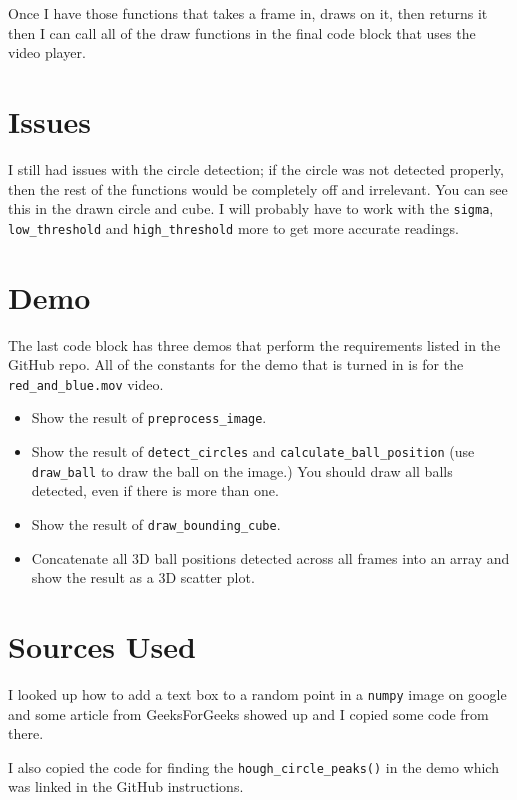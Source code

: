 \documentclass[11pt]{article}
\begin{document}
Once I have those functions that takes a frame in, draws on it, then returns it then I can call all of the draw functions in the final code block that uses the video player.

\section{Issues}

I still had issues with the circle detection; if the circle was not detected properly, then the rest of the functions would be completely off and irrelevant.
You can see this in the drawn circle and cube.
I will probably have to work with the \lstinline{sigma}, \lstinline{low_threshold} and \lstinline{high_threshold} more to get more accurate readings.

\section{Demo}

The last code block has three demos that perform the requirements listed in the GitHub repo.
All of the constants for the demo that is turned in is for the \lstinline{red_and_blue.mov} video.

\begin{itemize}
	\item Show the result of \lstinline{preprocess_image}.
	\item Show the result of \lstinline{detect_circles} and \lstinline{calculate_ball_position} (use \lstinline{draw_ball} to draw the ball on the image.) You should draw all balls detected, even if there is more than one.
	\item Show the result of \lstinline{draw_bounding_cube}.
	\item Concatenate all 3D ball positions detected across all frames into an array and show the result as a 3D scatter plot.

\end{itemize}

\section{Sources Used}

I looked up how to add a text box to a random point in a \lstinline{numpy} image on google and some article from GeeksForGeeks showed up and I copied some code from there.

I also copied the code for finding the \lstinline{hough_circle_peaks()} in the demo which was linked in the GitHub instructions.
\end{document}
